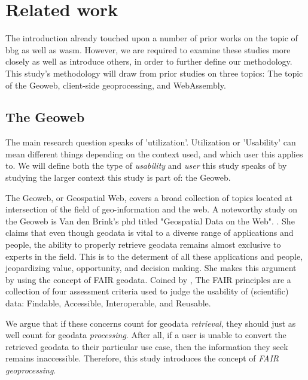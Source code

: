 \chapter{Related work}

The introduction already touched upon a number of prior works on the topic of \ac{bbg} as well as \ac{wasm}.
However, we are required to examine these studies more closely as well as introduce others, in order to further define our methodology. This study's methodology will draw from prior studies on three topics: The topic of the Geoweb, client-side geoprocessing, and WebAssembly.


\section{The Geoweb}
\label{sec:geoweb}

The main research question speaks of 'utilization'. Utilization or 'Usability' can mean different things depending on the context used, and which user this applies to. We will define both the type of \emph{usability} and \emph{user} this study speaks of by studying the larger context this study is part of: the Geoweb.

The Geoweb, or Geospatial Web, covers a broad collection of topics located at intersection of the field of geo-information and the web. A noteworthy study on the Geoweb is Van den Brink's phd titled "Geospatial Data on the Web". \cite{brink_geospatial_2018}. She claims that even though geodata is vital to a diverse range of applications and people, the ability to properly retrieve geodata remains almost exclusive to experts in the field. This is to the determent of all these applications and people, jeopardizing value, opportunity, and decision making. She makes this argument by using the concept of FAIR geodata. Coined by \cite{mark_d_wilkinson_fair_2016}, The FAIR principles are a collection of four assessment criteria used to judge the usability of (scientific) data: Findable, Accessible, Interoperable, and Reusable. 

We argue that if these concerns count for geodata \textit{retrieval}, they should just as well count for geodata \textit{processing}. After all, if a user is unable to convert the retrieved geodata to their particular use case, then the information they seek remains inaccessible. Therefore, this study introduces the concept of \emph{FAIR geoprocessing}. 

